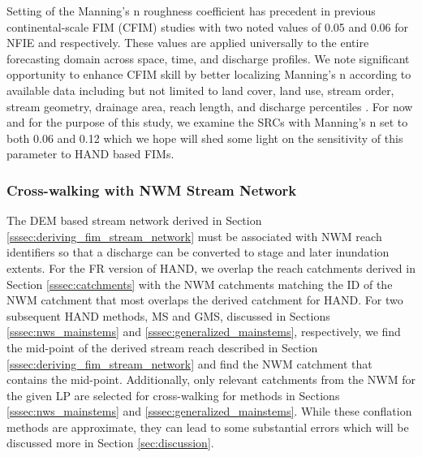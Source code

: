 Setting of the Manning's n roughness coefficient has precedent in previous continental-scale FIM (CFIM) studies \cite{maidment2017conceptual,liu2016cybergis,liu2020height,djokic2019arc,garousi2019terrain,zheng2018geoflood} with two noted values of 0.05 and 0.06 for NFIE and  respectively. 
These values are applied universally to the entire forecasting domain across space, time, and discharge profiles.
We note significant opportunity to enhance CFIM skill by better localizing Manning's n according to available data including but not limited to land cover, land use, stream order, stream geometry, drainage area, reach length, and discharge percentiles \cite{garousi2019terrain,johnson2019integrated,godbout2019error,zheng2018river}.
For now and for the purpose of this study, we examine the SRCs with Manning's n set to both 0.06 and 0.12 which we hope will shed some light on the sensitivity of this parameter to HAND based FIMs.
%
\subsubsection{Cross-walking with NWM Stream Network}
\label{sssec:cross_walking_networks}
%
The DEM based stream network derived in Section \ref{sssec:deriving_fim_stream_network} must be associated with NWM reach identifiers so that a discharge can be converted to stage and later inundation extents.
For the FR version of HAND, we overlap the reach catchments derived in Section \ref{sssec:catchments} with the NWM catchments matching the ID of the NWM catchment that most overlaps the derived catchment for HAND.
For two subsequent HAND methods, MS and GMS, discussed in Sections \ref{sssec:nws_mainstems} and \ref{sssec:generalized_mainstems}, respectively, we find the mid-point of the derived stream reach described in Section \ref{sssec:deriving_fim_stream_network} and find the NWM catchment that contains the mid-point.
Additionally, only relevant catchments from the NWM for the given LP are selected for cross-walking for methods in Sections \ref{sssec:nws_mainstems} and \ref{sssec:generalized_mainstems}.
While these conflation methods are approximate, they can lead to some substantial errors which will be discussed more in Section \ref{sec:discussion}.
%

